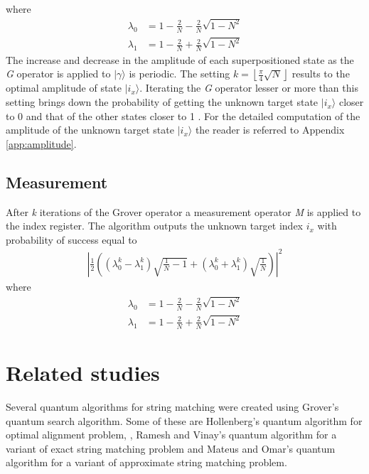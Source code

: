 where
\begin{align}
\lambda_0 &= 1 - \frac{2}{N} - \frac{2}{N}\sqrt{1-N^2}\\
\lambda_1 &= 1 - \frac{2}{N} + \frac{2}{N}\sqrt{1-N^2}
\end{align}
The increase and decrease in the amplitude of each superpositioned state as the \textit{G} operator is applied to $\vert \gamma \rangle$ is periodic. The setting $k = \left\lfloor \frac{\pi}{4} \sqrt{N} \right\rfloor$ results to the optimal amplitude of state $\vert i_{x} \rangle$. Iterating the \textit{G} operator lesser or more than this setting brings down the probability of getting the unknown target state $\vert i_{x} \rangle$ closer to 0 and that of the other states closer to 1 \cite{Grover1996}. For the detailed computation of the amplitude of the unknown target state $\vert i_{x} \rangle$ the reader is referred to Appendix \ref{app:amplitude}.

\subsection*{Measurement}
After \textit{k} iterations of the Grover operator a measurement operator \textit{M} is applied to the index register. The algorithm outputs the unknown target index $i_{x}$ with probability of success equal to
\begin{align}
\left\vert \frac{1}{2} 
\left(
\left(\lambda_0^k - \lambda_1^k \right)\sqrt{\frac{1}{N} - 1} + \left(\lambda_0^k + \lambda_1^k\right) \sqrt{\frac{1}{N}}
\right) \right\vert^2
\end{align}
where
\begin{align}
\lambda_0 &= 1 - \frac{2}{N} - \frac{2}{N}\sqrt{1-N^2}\\
\lambda_1 &= 1 - \frac{2}{N} + \frac{2}{N}\sqrt{1-N^2}
\end{align}

\section{Related studies}
Several quantum algorithms for string matching were created using Grover's quantum search algorithm. Some of these are Hollenberg's quantum algorithm for optimal alignment problem,  \cite{Hollenberg2000}, Ramesh and Vinay's quantum algorithm for a variant of exact string matching problem\cite{Ramesh2003} and Mateus and Omar's quantum algorithm for a variant of approximate string matching problem\cite{Mateus2006}.

